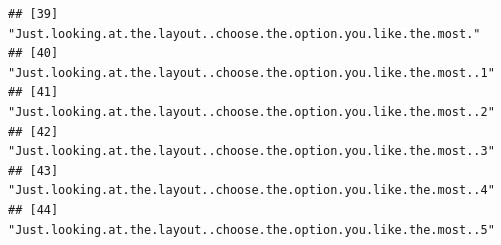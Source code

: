 \documentclass[
]{article}
\begin{document}
\begin{verbatim}
## [39] "Just.looking.at.the.layout..choose.the.option.you.like.the.most."                                                                                                                                          
## [40] "Just.looking.at.the.layout..choose.the.option.you.like.the.most..1"                                                                                                                                        
## [41] "Just.looking.at.the.layout..choose.the.option.you.like.the.most..2"                                                                                                                                        
## [42] "Just.looking.at.the.layout..choose.the.option.you.like.the.most..3"                                                                                                                                        
## [43] "Just.looking.at.the.layout..choose.the.option.you.like.the.most..4"                                                                                                                                        
## [44] "Just.looking.at.the.layout..choose.the.option.you.like.the.most..5"
\end{verbatim}
\end{document}
